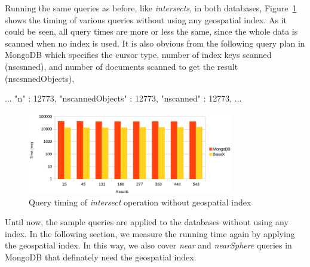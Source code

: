 \documentclass[a4paper,12pt]{article}
\begin{document}

Running the same queries as before, like \textit{intersects}, in both databases, Figure~\ref{figBXvsMongoNoIndexIntersects} shows the timing of various queries without using any geospatial index. As it could be seen, all query times are more or less the same, since the whole data is scanned when no index is used. It is also obvious from the following query plan in MongoDB which specifies the cursor type, number of index keys scanned (nscsnned), and number of documents scanned to get the result (nscsnnedObjects),
\begin{fakeJSON}
...
"n" : 12773,
"nscannedObjects" : 12773,
"nscanned" : 12773,
...
\end{fakeJSON}

\begin{figure}
\centering
\includegraphics[width=0.8\textwidth,height=0.25\textheight]{BXvsMongo-NoIndex-Intersects-log}
\caption{Query timing of \textit{intersect} operation without geospatial index}
\label{figBXvsMongoNoIndexIntersects}
\end{figure}


Until now, the sample queries are applied to the databases without using any index. 
In the following section, we measure the running time again by applying the geospatial index.
In this way, we also cover \textit{near} and \textit{nearSphere} queries in MongoDB that definately need the geospatial index.  


\end{document}
